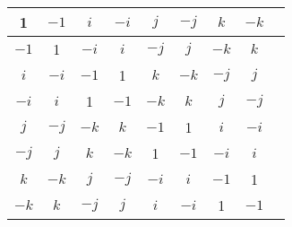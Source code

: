\documentclass{article}
\begin{document}
\begin{center}
    \begin{tabular}{ |c|c|c|c|c|c|c|c|c| } 
        \hline
        1 & $-1$ & $i$ & $-i$ & $j$ & $-j$ & $k$ & $-k$ \\
        \hline
        $-1$ & 1 & $-i$ & $i$ & $-j$ & $j$ & $-k$ & $k$ \\
        \hline
        $i$ & $-i$ & $-1$ & 1 & $k$ & $-k$ & $-j$ & $j$ \\
        \hline
        $-i$ & $i$ & 1 & $-1$ & $-k$ & $k$ & $j$ & $-j$ \\
        \hline
        $j$ & $-j$ & $-k$ & $k$ & $-1$ & 1 & $i$ & $-i$ \\
        \hline
        $-j$ & $j$ & $k$ & $-k$ & 1 & $-1$ & $-i$ & $i$ \\
        \hline
        $k$ & $-k$ & $j$ & $-j$ & $-i$ & $i$ & $-1$ & 1 \\
        \hline
        $-k$ & $k$ & $-j$ & $j$ & $i$ & $-i$ & 1 & $-1$ \\
        \hline
    \end{tabular}
\end{center}
\end{document}
